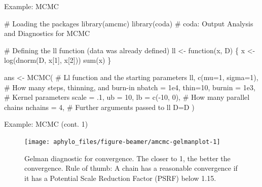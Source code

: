 \documentclass[9pt,ignorenonframetext,]{beamer}
\newenvironment{Shaded}{\begin{snugshade}}{\end{snugshade}}
\newcommand{\KeywordTok}[1]{\textcolor[rgb]{0.94,0.87,0.69}{#1}}
\newcommand{\DataTypeTok}[1]{\textcolor[rgb]{0.87,0.87,0.75}{#1}}
\newcommand{\DecValTok}[1]{\textcolor[rgb]{0.86,0.86,0.80}{#1}}
\newcommand{\FloatTok}[1]{\textcolor[rgb]{0.75,0.75,0.82}{#1}}
\newcommand{\StringTok}[1]{\textcolor[rgb]{0.80,0.58,0.58}{#1}}
\newcommand{\CommentTok}[1]{\textcolor[rgb]{0.50,0.62,0.50}{#1}}
\newcommand{\ControlFlowTok}[1]{\textcolor[rgb]{0.94,0.87,0.69}{#1}}
\newcommand{\OperatorTok}[1]{\textcolor[rgb]{0.94,0.94,0.82}{#1}}
\newcommand{\NormalTok}[1]{\textcolor[rgb]{0.80,0.80,0.80}{#1}}
\begin{document}
\begin{frame}[fragile,t]{Example: MCMC}

\footnotesize

\normalsize

\footnotesize

\begin{Shaded}
\begin{Highlighting}[]
\CommentTok{# Loading the packages}
\KeywordTok{library}\NormalTok{(amcmc)}
\KeywordTok{library}\NormalTok{(coda) }\CommentTok{# coda: Output Analysis and Diagnostics for MCMC}

\CommentTok{# Defining the ll function (data was already defined)}
\NormalTok{ll <-}\StringTok{ }\ControlFlowTok{function}\NormalTok{(x, D) \{}
\NormalTok{  x <-}\StringTok{ }\KeywordTok{log}\NormalTok{(}\KeywordTok{dnorm}\NormalTok{(D, x[}\DecValTok{1}\NormalTok{], x[}\DecValTok{2}\NormalTok{]))}
  \KeywordTok{sum}\NormalTok{(x)}
\NormalTok{\}}

\NormalTok{ans <-}\StringTok{ }\KeywordTok{MCMC}\NormalTok{(}
  \CommentTok{# Ll function and the starting parameters}
\NormalTok{  ll, }\KeywordTok{c}\NormalTok{(}\DataTypeTok{mu=}\DecValTok{1}\NormalTok{, }\DataTypeTok{sigma=}\DecValTok{1}\NormalTok{),}
  \CommentTok{# How many steps, thinning, and burn-in}
  \DataTypeTok{nbatch =} \FloatTok{1e4}\NormalTok{, }\DataTypeTok{thin=}\DecValTok{10}\NormalTok{, }\DataTypeTok{burnin =} \FloatTok{1e3}\NormalTok{,}
  \CommentTok{# Kernel parameters}
  \DataTypeTok{scale =}\NormalTok{ .}\DecValTok{1}\NormalTok{, }\DataTypeTok{ub =} \DecValTok{10}\NormalTok{, }\DataTypeTok{lb =} \KeywordTok{c}\NormalTok{(}\OperatorTok{-}\DecValTok{10}\NormalTok{, }\DecValTok{0}\NormalTok{),}
  \CommentTok{# How many parallel chains}
  \DataTypeTok{nchains =} \DecValTok{4}\NormalTok{,}
  \CommentTok{# Further arguments passed to ll}
  \DataTypeTok{D=}\NormalTok{D}
\NormalTok{  )}
\end{Highlighting}
\end{Shaded}

\normalsize

\end{frame}

\begin{frame}[t]{Example: MCMC (cont. 1)}

\footnotesize

\begin{figure}

{\centering \texttt{[image: aphylo\_files/figure-beamer/amcmc-gelmanplot-1]} 

}

\caption{Gelman diagnostic for convergence. The closer to 1, the better the convergence. Rule of thumb: A chain has a reasonable convergence if it has a Potential Scale Reduction Factor (PSRF) below 1.15.}\label{fig:amcmc-gelmanplot}
\end{figure}

\normalsize

\end{frame}
\end{document}
